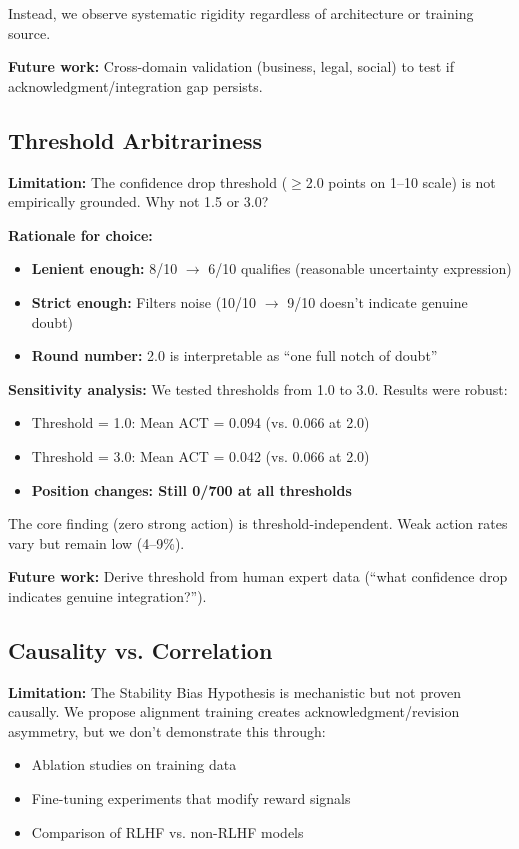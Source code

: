 \documentclass[11pt]{article}
\begin{document}
Instead, we observe systematic rigidity regardless of architecture or training source.

\textbf{Future work:} Cross-domain validation (business, legal, social) to test if acknowledgment/integration gap persists.

\subsection{Threshold Arbitrariness}

\textbf{Limitation:} The confidence drop threshold ($\geq$2.0 points on 1--10 scale) is not empirically grounded. Why not 1.5 or 3.0?

\textbf{Rationale for choice:}
\begin{itemize}
\item \textbf{Lenient enough:} 8/10 $\rightarrow$ 6/10 qualifies (reasonable uncertainty expression)
\item \textbf{Strict enough:} Filters noise (10/10 $\rightarrow$ 9/10 doesn't indicate genuine doubt)
\item \textbf{Round number:} 2.0 is interpretable as ``one full notch of doubt''
\end{itemize}

\textbf{Sensitivity analysis:} We tested thresholds from 1.0 to 3.0. Results were robust:
\begin{itemize}
\item Threshold = 1.0: Mean ACT = 0.094 (vs. 0.066 at 2.0)
\item Threshold = 3.0: Mean ACT = 0.042 (vs. 0.066 at 2.0)
\item \textbf{Position changes: Still 0/700 at all thresholds}
\end{itemize}

The core finding (zero strong action) is threshold-independent. Weak action rates vary but remain low (4--9\%).

\textbf{Future work:} Derive threshold from human expert data (``what confidence drop indicates genuine integration?'').

\subsection{Causality vs. Correlation}

\textbf{Limitation:} The Stability Bias Hypothesis is mechanistic but not proven causally. We propose alignment training creates acknowledgment/revision asymmetry, but we don't demonstrate this through:
\begin{itemize}
\item Ablation studies on training data
\item Fine-tuning experiments that modify reward signals
\item Comparison of RLHF vs. non-RLHF models
\end{itemize}
\end{document}
